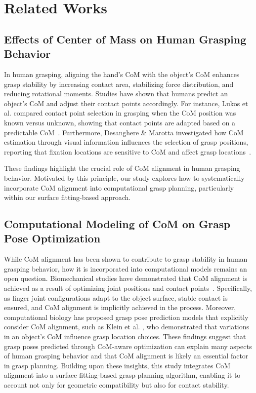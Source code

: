 \section{Related Works}
\subsection{Effects of Center of Mass on Human Grasping Behavior}
        In human grasping, aligning the hand's CoM with the object's CoM enhances grasp stability by increasing contact area, stabilizing force distribution, and reducing rotational moments. Studies have shown that humans predict an object's CoM and adjust their contact points accordingly.
        For instance, Lukos et al. compared contact point selection in grasping when the CoM position was known versus unknown, showing that contact points are adapted based on a predictable CoM~\cite{CoM1}.
        Furthermore, Desanghere \& Marotta investigated how CoM estimation through visual information influences the selection of grasp positions, reporting that fixation locations are sensitive to CoM and affect grasp locations~\cite{CoM2}.
        
        These findings highlight the crucial role of CoM alignment in human grasping behavior. Motivated by this principle, our study explores how to systematically incorporate CoM alignment into computational grasp planning, particularly within our surface fitting-based approach.


    \subsection{Computational Modeling of CoM on Grasp Pose Optimization}
        While CoM alignment has been shown to contribute to grasp stability in human grasping behavior, how it is incorporated into computational models remains an open question.
        Biomechanical studies have demonstrated that CoM alignment is achieved as a result of optimizing joint positions and contact points~\cite{biomechanics_JoB_2005}.
        Specifically, as finger joint configurations adapt to the object surface, stable contact is ensured, and CoM alignment is implicitly achieved in the process.
        Moreover, computational biology has proposed grasp pose prediction models that explicitly consider CoM alignment, such as Klein et al. \cite{CoM3}, who demonstrated that variations in an object's CoM influence grasp location choices. These findings suggest that grasp poses predicted through CoM-aware optimization can explain many aspects of human grasping behavior and that CoM alignment is likely an essential factor in grasp planning. Building upon these insights, this study integrates CoM alignment into a surface fitting-based grasp planning algorithm, enabling it to account not only for geometric compatibility but also for contact stability.



